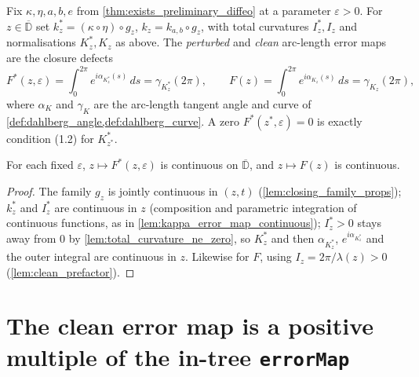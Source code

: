 \begin{definition}

  \label{def:arclength_error_map}
  Fix $\kappa,\eta,a,b,e$ from \cref{thm:exists_preliminary_diffeo} at a parameter
  $\varepsilon>0$. For $z\in\overline{\mathbb{D}}$ set
  $k^*_z = (\kappa\circ\eta)\circ g_z$, $k_z = k_{a,b}\circ g_z$, with total
  curvatures $I^*_z,I_z$ and normalisations $K^*_z,K_z$ as above. The
  \emph{perturbed} and \emph{clean} arc-length error maps are the closure defects
  \[
    F^*(z,\varepsilon)=\int_0^{2\pi}e^{i\alpha_{K^*_z}(s)}\,ds=\gamma_{K^*_z}(2\pi),
    \qquad
    F(z)=\int_0^{2\pi}e^{i\alpha_{K_z}(s)}\,ds=\gamma_{K_z}(2\pi),
  \]
  where $\alpha_{K}$ and $\gamma_K$ are the arc-length tangent angle and curve of
  \cref{def:dahlberg_angle,def:dahlberg_curve}. A zero $F^*(z^*,\varepsilon)=0$ is
  exactly condition (1.2) for $K^*_{z^*}$.
\end{definition}

\begin{lemma}

  \label{lem:arclength_error_continuous}
  For each fixed $\varepsilon$, $z\mapsto F^*(z,\varepsilon)$ is continuous on
  $\overline{\mathbb{D}}$, and $z\mapsto F(z)$ is continuous.
\end{lemma}
\begin{proof}
  \leanok
  The family $g_z$ is jointly continuous in $(z,t)$
  (\cref{lem:closing_family_props}); $k^*_z$ and $I^*_z$ are continuous in $z$
  (composition and parametric integration of continuous functions, as in
  \cref{lem:kappa_error_map_continuous}); $I^*_z>0$ stays away from $0$ by
  \cref{lem:total_curvature_ne_zero}, so $K^*_z$ and then $\alpha_{K^*_z}$,
  $e^{i\alpha_{K^*_z}}$ and the outer integral are continuous in $z$. Likewise for
  $F$, using $I_z=2\pi/\lambda(z)>0$ (\cref{lem:clean_prefactor}).
\end{proof}

\section{The clean error map is a positive multiple of the in-tree \texttt{errorMap}}

